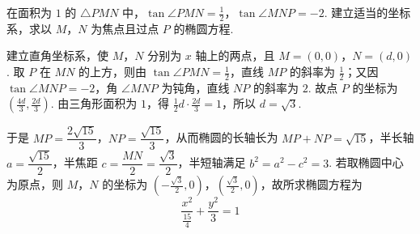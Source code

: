 \begin{problem}
在面积为 \(1\) 的 \(\triangle PMN\) 中，\(\tan \angle PMN=\frac{1}{2}\)，\(\tan \angle MNP=-2\). 建立适当的坐标系，求以 \(M\)，\(N\) 为焦点且过点 \(P\) 的椭圆方程.
\end{problem}

\begin{solution}
建立直角坐标系，使 \(M\)，\(N\) 分别为 \(x\) 轴上的两点，且 \(M=(0,0)\)，\(N=(d,0)\). 取 \(P\) 在 \(MN\) 的上方，则由 \(\tan\angle PMN=\frac12\)，直线 \(MP\) 的斜率为 \(\frac12\)；又因 \(\tan\angle MNP=-2\)，角 \(\angle MNP\) 为钝角，直线 \(NP\) 的斜率为 \(2\). 故点 \(P\) 的坐标为 \(\left(\frac{4d}{3},\frac{2d}{3}\right)\). 由三角形面积为 \(1\)，得 \(\frac12d\cdot\frac{2d}{3}=1\)，所以 \(d=\sqrt{3}\).

于是 \(MP=\dfrac{2\sqrt{15}}{3}\)，\(NP=\dfrac{\sqrt{15}}{3}\)，从而椭圆的长轴长为 \(MP+NP=\sqrt{15}\)，半长轴 \(a=\dfrac{\sqrt{15}}{2}\)，半焦距 \(c=\dfrac{MN}{2}=\dfrac{\sqrt{3}}{2}\)，半短轴满足 \(b^2=a^2-c^2=3\). 若取椭圆中心为原点，则 \(M\)，\(N\) 的坐标为 \(\left(-\frac{\sqrt{3}}{2},0\right)\)，\(\left(\frac{\sqrt{3}}{2},0\right)\)，故所求椭圆方程为
\[
\frac{x^2}{\frac{15}{4}}+\frac{y^2}{3}=1
\]
\end{solution}
